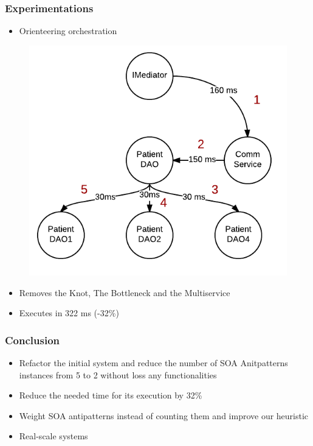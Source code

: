 \documentclass{beamer}
\begin{document}
\begin{frame}
\frametitle{Experimentations}
\begin{itemize}
\item Orienteering orchestration
\end{itemize}
\begin{figure}
    \centering
	\includegraphics[scale=0.3]{media/scenario3.png}
\end{figure}
\begin{itemize}
\item Removes the Knot, The Bottleneck and the Multiservice
\item Executes in 322 ms (-32\%)
\end{itemize}
\end{frame}

\begin{frame}
\frametitle{Conclusion}
\begin{itemize}
\item Refactor the initial system and
reduce the number of SOA Anitpatterns instances from 5 to 2 without loss any
functionalities
\item Reduce the needed time for its execution by 32\%
\vspace{1cm}
\item Weight SOA antipatterns instead of counting them and
improve our heuristic
\item Real-scale systems
\end{itemize}


\end{frame}
\end{document}
